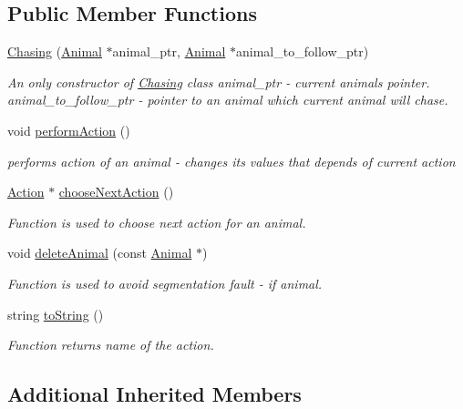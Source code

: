 \subsection*{Public Member Functions}
\begin{DoxyCompactItemize}
\item 
\hyperlink{class_chasing_ad64282bb5e01ec074b3c212a879893b2}{Chasing} (\hyperlink{class_animal}{Animal} $\ast$animal\+\_\+ptr, \hyperlink{class_animal}{Animal} $\ast$animal\+\_\+to\+\_\+follow\+\_\+ptr)
\begin{DoxyCompactList}\small\item\em An only constructor of \hyperlink{class_chasing}{Chasing} class  animal\+\_\+ptr -\/ current animal\textquotesingle{}s pointer.  animal\+\_\+to\+\_\+follow\+\_\+ptr -\/ pointer to an animal which current animal will chase. \end{DoxyCompactList}\item 
void \hyperlink{class_chasing_a244b35d77a91c56686bffe37a50f43d2}{perform\+Action} ()
\begin{DoxyCompactList}\small\item\em performs action of an animal -\/ changes it\textquotesingle{}s values that depends of current action \end{DoxyCompactList}\item 
\hyperlink{class_action}{Action} $\ast$ \hyperlink{class_chasing_a2da36a5808c4ecdca22312ce3d68b651}{choose\+Next\+Action} ()
\begin{DoxyCompactList}\small\item\em Function is used to choose next action for an animal. \end{DoxyCompactList}\item 
void \hyperlink{class_chasing_ac532945a742df4c7a2b73f9bcb93a686}{delete\+Animal} (const \hyperlink{class_animal}{Animal} $\ast$)
\begin{DoxyCompactList}\small\item\em Function is used to avoid segmentation fault -\/ if animal. \end{DoxyCompactList}\item 
string \hyperlink{class_chasing_a94dad51660eda8bb8f7f9b8890bc128e}{to\+String} ()
\begin{DoxyCompactList}\small\item\em Function returns name of the action. \end{DoxyCompactList}\end{DoxyCompactItemize}
\subsection*{Additional Inherited Members}



